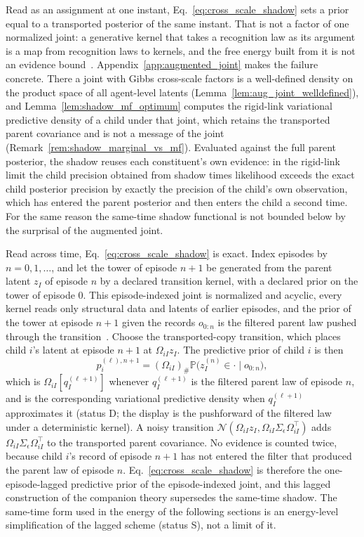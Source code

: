 Read as an assignment at one instant, Eq.~\eqref{eq:cross_scale_shadow} sets a prior equal to a transported posterior of the same instant. That is not a factor of one normalized joint: a generative kernel that takes a recognition law as its argument is a map from recognition laws to kernels, and the free energy built from it is not an evidence bound~\cite[Chs.~4 and 12]{DennisGaugeVFE2026}. Appendix~\ref{app:augmented_joint} makes the failure concrete. There a joint with Gibbs cross-scale factors is a well-defined density on the product space of all agent-level latents (Lemma~\ref{lem:aug_joint_welldefined}), and Lemma~\ref{lem:shadow_mf_optimum} computes the rigid-link variational predictive density of a child under that joint, which retains the transported parent covariance and is not a message of the joint (Remark~\ref{rem:shadow_marginal_vs_mf}). Evaluated against the full parent posterior, the shadow reuses each constituent's own evidence: in the rigid-link limit the child precision obtained from shadow times likelihood exceeds the exact child posterior precision by exactly the precision of the child's own observation, which has entered the parent posterior and then enters the child a second time. For the same reason the same-time shadow functional is not bounded below by the surprisal of the augmented joint.

Read across time, Eq.~\eqref{eq:cross_scale_shadow} is exact. Index episodes by $n = 0, 1, \ldots$, and let the tower of episode $n+1$ be generated from the parent latent $z_I$ of episode $n$ by a declared transition kernel, with a declared prior on the tower of episode $0$. This episode-indexed joint is normalized and acyclic, every kernel reads only structural data and latents of earlier episodes, and the prior of the tower at episode $n+1$ given the records $o_{0:n}$ is the filtered parent law pushed through the transition~\cite[Ch.~12, the delayed-feedback proposition]{DennisGaugeVFE2026}. Choose the transported-copy transition, which places child $i$'s latent at episode $n+1$ at $\Omega_{iI} z_I$. The predictive prior of child $i$ is then
\begin{equation*}
p_i^{(\ell), n+1} = (\Omega_{iI})_{\#} \mathbb{P}\big(z_I^{(n)} \in \cdot \mid o_{0:n}\big),
\end{equation*}
which is $\Omega_{iI}[q_I^{(\ell+1)}]$ whenever $q_I^{(\ell+1)}$ is the filtered parent law of episode $n$, and is the corresponding variational predictive density when $q_I^{(\ell+1)}$ approximates it (status D; the display is the pushforward of the filtered law under a deterministic kernel). A noisy transition $\mathcal{N}(\Omega_{iI} z_I, \Omega_{iI} \Sigma_\epsilon \Omega_{iI}^\top)$ adds $\Omega_{iI}\Sigma_\epsilon\Omega_{iI}^\top$ to the transported parent covariance. No evidence is counted twice, because child $i$'s record of episode $n+1$ has not entered the filter that produced the parent law of episode $n$. Eq.~\eqref{eq:cross_scale_shadow} is therefore the one-episode-lagged predictive prior of the episode-indexed joint, and this lagged construction of the companion theory supersedes the same-time shadow. The same-time form used in the energy of the following sections is an energy-level simplification of the lagged scheme (status S), not a limit of it.

